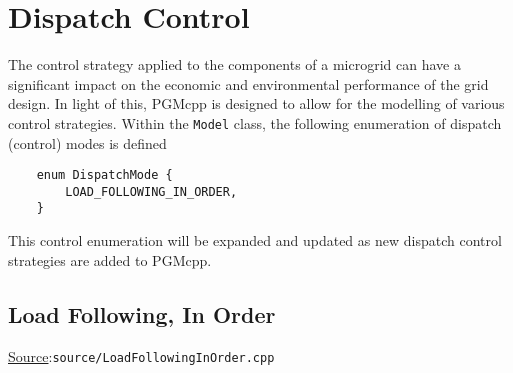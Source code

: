 \documentclass[12pt, letterpaper]{report}
\begin{document}
\chapter{Dispatch Control}

The control strategy applied to the components of a microgrid can have a significant impact on the economic and environmental performance of the grid design. In light of this, PGMcpp is designed to allow for the modelling of various control strategies. Within the \texttt{Model} class, the following enumeration of dispatch (control) modes is defined

\begin{verbatim}
    enum DispatchMode {
        LOAD_FOLLOWING_IN_ORDER,
    }
\end{verbatim}

\noindent This control enumeration will be expanded and updated as new dispatch control strategies are added to PGMcpp.

\section{Load Following, In Order}

\begin{large}
\noindent\underline{Source}:\quad\texttt{source/LoadFollowingInOrder.cpp}\par
\end{large}
\vspace{5mm}
\end{document}
